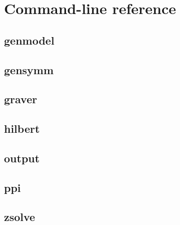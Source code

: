 \chapter{Command-line reference}
\label{Chapter: Reference}

\section{genmodel}
{\small
}

\clearpage
\section{gensymm}
{\small
}

\clearpage
\section{graver}

{\small
}

\clearpage
\section{hilbert}

{\small
}

\clearpage
\section{output}
{\small
}

\clearpage
\section{ppi}
{\small
}

\clearpage
\section{zsolve}
{\small
}


